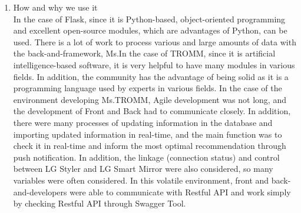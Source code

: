 \documentclass[conference]{IEEEtran}
\begin{document}
\begin{enumerate}
    \item How and why we use it\\
    In the case of Flask, since it is Python-based, object-oriented programming and excellent open-source modules, which are advantages of Python, can be used. There is a lot of work to process various and large amounts of data with the back-and-framework, Ms.In the case of TROMM, since it is artificial intelligence-based software, it is very helpful to have many modules in various fields. In addition, the community has the advantage of being solid as it is a programming language used by experts in various fields. In the case of the environment developing Ms.TROMM, Agile development was not long, and the development of Front and Back had to communicate closely. In addition, there were many processes of updating information in the database and importing updated information in real-time, and the main function was to check it in real-time and inform the most optimal recommendation through push notification. In addition, the linkage (connection status) and control between LG Styler and LG Smart Mirror were also considered, so many variables were often considered. In this volatile environment, front and back-and-developers were able to communicate with Restful API and work simply by checking Restful API through Swagger Tool. \\ \\
\end{enumerate}
\end{document}
